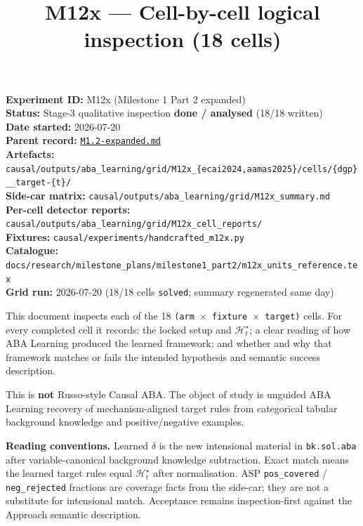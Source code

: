 \documentclass[11pt]{article}
\title{M12x --- Cell-by-cell logical inspection (18 cells)}
\author{}
\date{}
\begin{document}
\maketitle

\textbf{Experiment ID:} M12x (Milestone 1 Part 2 expanded)\\
\textbf{Status:} Stage-3 qualitative inspection \textbf{done / analysed} (18/18 written)\\
\textbf{Date started:} 2026-07-20\\
\textbf{Parent record:} \href{M1.2-expanded.md}{\texttt{M1.2-expanded.md}}\\
\textbf{Artefacts:} \texttt{causal/outputs/aba\_learning/grid/M12x\_\{ecai2024,aamas2025\}/cells/\{dgp\}\_\_target-\{t\}/}\\
\textbf{Side-car matrix:} \texttt{causal/outputs/aba\_learning/grid/M12x\_summary.md}\\
\textbf{Per-cell detector reports:} \texttt{causal/outputs/aba\_learning/grid/M12x\_cell\_reports/}\\
\textbf{Fixtures:} \texttt{causal/experiments/handcrafted\_m12x.py}\\
\textbf{Catalogue:} \texttt{docs/research/milestone\_plans/milestone1\_part2/m12x\_units\_reference.tex}\\
\textbf{Grid run:} 2026-07-20 (18/18 cells \texttt{solved}; summary regenerated same day)

This document inspects each of the 18 \texttt{(arm \(\times\) fixture \(\times\) target)} cells. For every completed cell it records: the locked setup and \(\mathcal{H}_t^\star\); a clear reading of how ABA Learning produced the learned framework; and whether and why that framework matches or fails the intended hypothesis and semantic success description.

This is \textbf{not} Russo-style Causal ABA. The object of study is unguided ABA Learning recovery of mechanism-aligned target rules from categorical tabular background knowledge and positive/negative examples.

\textbf{Reading conventions.} Learned \(\delta\) is the new intensional material in \texttt{bk.sol.aba} after variable-canonical background knowledge subtraction. Exact match means the learned target rules equal \(\mathcal{H}_t^\star\) after normalisation. ASP \texttt{pos\_covered} / \texttt{neg\_rejected} fractions are coverage facts from the side-car; they are not a substitute for intensional match. Acceptance remains inspection-first against the Approach semantic description.
\end{document}
